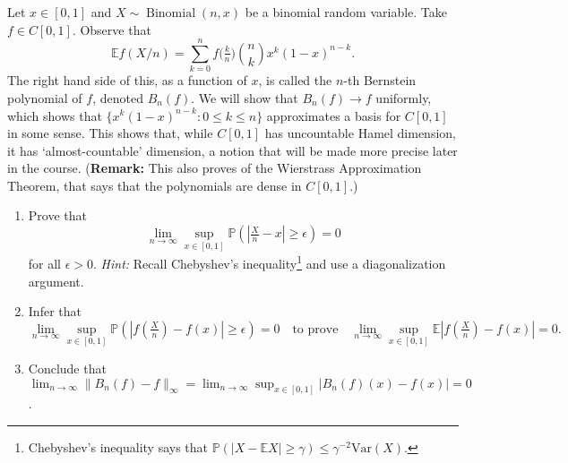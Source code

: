 \documentclass[12pt,letterpaper,cm]{hmcpset}
\begin{document}
\begin{solution}
    \vfill
\end{solution}
\clearpage


\begin{problem}[EC]
    Let $x\in[0,1]$ and $X\sim\operatorname{Binomial}(n,x)$ be a binomial
    random variable. Take $f\in C[0,1]$. Observe that
    \[
        \mathbb{E} f(X/n) = \sum_{k=0}^n f\bigl(\tfrac{k}{n}\bigr) {n\choose k} x^k (1-x)^{n-k}.
    \]
    The right hand side of this, as a function of $x$, is called the $n$-th Bernstein
    polynomial of $f$, denoted $B_n(f)$. We will show that $B_n(f) \to f$ uniformly,
    which shows that $\{x^k (1-x)^{n-k} : 0\leq k \leq n\}$ approximates a basis
    for $C[0,1]$ in some sense. This shows that, while $C[0,1]$ has uncountable Hamel dimension,
    it has `almost-countable' dimension, a notion that will be made more precise later in
    the course. (\textbf{Remark:} This also proves of the Wierstrass Approximation Theorem,
    that says that the polynomials are dense in $C[0,1]$.)
    \begin{enumerate}[(1)]
        \item Prove that
            \[
                \lim_{n\to\infty}\sup_{x\in[0,1]}\mathbb{P}(|\tfrac{X}{n} - x|\geq \epsilon) = 0
            \]
            for all $\epsilon > 0$. \textit{Hint:} Recall Chebyshev's
            inequality\footnote{Chebyshev's inequality says that
            $\mathbb{P}(|X - \mathbb{E}X| \geq \gamma)\leq \gamma^{-2}\text{Var}(X)$.} and use a
            diagonalization argument.
        \item Infer that
            \[
                \lim_{n\to\infty}\sup_{x\in[0,1]} \mathbb{P}(|f(\tfrac{X}{n}) - f(x)|\geq \epsilon) = 0\quad\text{to prove}\quad
                \lim_{n\to\infty}\sup_{x\in[0,1]}\mathbb{E}|f(\tfrac{X}{n}) - f(x)| = 0.
            \]
        \item Conclude that $\lim_{n\to\infty}\|B_n(f) - f\|_\infty =
            \lim_{n\to\infty}\sup_{x\in[0,1]}|B_n(f)(x) - f(x)| = 0$.
    \end{enumerate}
\end{problem}

\begin{solution}
    \vfill
\end{solution}
\clearpage
\end{document}
